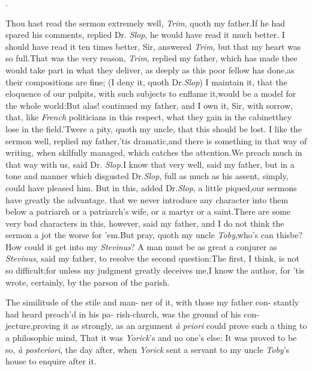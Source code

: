 \documentclass{article}
\begin{document}
\vskip 32pt
\centerline{.}

\newpage
Thou hast read the sermon extremely well, \textit{Trim}, quoth
my father.\tsk If he had spared his comments, replied Dr.\@
\textit{Slop}, he would have read it much better.  I should have
read it ten times better, Sir, answered \textit{Trim}, but that
my heart was so full.\tsk That was the very reason,
\textit{Trim}, replied my father, which has made thee 
would take part in what they deliver, as deeply as
this poor fellow has done,\tsk as their compositions are fine;
(I deny it, quoth Dr.\@ \textit{Slop}) I maintain it,
that the eloquence of our pulpits, with such subjects to enflame
it,\tsk would be a model for the whole world:\tsk But alas!
continued my father, and I own it, Sir, with sorrow, that, like
\textit{French} politicians in this respect, what they gain in
the cabinet\pb they lose in the field.\tsh ’Twere a pity, quoth my
uncle, that this should be lost. I like the sermon well, replied
my father,\tsh ’tis dramatic,\tsk and there is something in
that way of writing, when skilfully managed, which catches the
attention.\tsh We preach much in that way with us, said Dr.\@
\textit{Slop.}\tsk I know that very well, said my father,\tsk
but in a tone and manner which disgusted Dr.\@ \textit{Slop},
full as much as his assent, simply, could have pleased him.\tsh
But in this, added Dr.\@ \textit{Slop}, a little piqued,\tsk our
sermons have greatly the advantage, that we never introduce any
character into them below a patriarch or a patriarch’s wife, or
a martyr or a saint.\tsk There are some very bad characters in
this, however, said my father, and I do not think the sermon a
jot the worse for ’em.\tsh But pray, quoth my uncle
\textit{Toby},\tsk who’s can this\pb be?\tsk How could it get into
my \textit{Stevinus}? A man must be as great a conjurer as
\textit{Stevinus}, said my father, to resolve the second
question:\tsk The first, I think, is not so difficult;\tsh for
unless my judg\-ment greatly deceives me,\tsh I know the author,
for ’tis wrote, certainly, by the parson of the parish.

The similitude of the stile and man-\break
ner of it, with those my father con-\break
stantly had heard preach’d in his pa-\break
rish-church, was the ground of his con-\break
jecture,\tsh proving it as strongly, as an argument
\textit{à priori} could prove such a thing to a philosophic
mind, That it was \textit{Yorick}’s and no one’s
else:\tsh\break 
It was proved to be so, \textit{à posteriori},\break
the day after, when \textit{Yorick} sent a servant to my uncle
\textit{Toby}’s house to enquire\break
after it.
\end{document}
